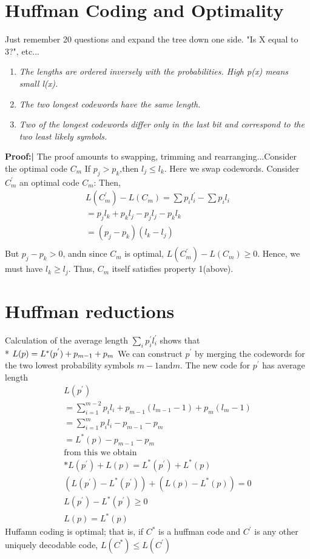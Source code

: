 \documentclass[10pt]{article}
\begin{document}
\begin{tiny}
\begin{multicols}{3}
\section*{Huffman Coding and Optimality}
Just remember 20 questions and expand the tree down one side. "Is X equal to 3?", etc...
\label{huffman}
\begin{enumerate}
	\item {\it The lengths are ordered inversely with the probabilities. High p(x) means small l(x).}
	\item {\it The two longest codewords have the same length.}
	\item {\it Two of the longest codewords differ only in the last bit and correspond to the two least likely symbols.}
\end{enumerate}
{\bf Proof:|} The proof amounts to swapping, trimming and rearranging...Consider the optimal code ${C_m}$
If ${p_j} > {p_k} \text{,then } {l_j} \leq {l_k}$. Here we swap codewords. Consider $C_m^{'}$ an optimal code ${C_m}$:
Then, \newline 
\begin{eqnarray}
L(C_m^{'}) - L(C_m) = \sum {p_i}{l_i^{'}} - \sum {p_i}{l_i} \\
={p_j}{l_k}+{p_k}{l_j} - {p_j}{l_j} - {p_k}{l_k}\\
=({p_j}-{p_k})({l_k}-{l_j})\\
\end{eqnarray}
But ${p_j} - {p_k} > 0$, andn since ${C_m}$ is optimal, $L(C_m^{'}) - L(C_m) \geq 0$.
Hence, we must have ${l_k} \geq {l_j}$. Thus, ${C_m}$ itself satisfies property 1(above).
\section*{Huffman reductions}
Calculation of the average length $\sum_i {p_i^{'}}{l_i^{'}}$ shows that \\*
$L(p) = L^{*}(p^{'})+p_{m-1} + p_m\\$
We can construct ${p^{'}}$ by merging the codewords for the two lowest probability symbols
${m-1} \text{and} {m}$.  The new code for ${p^{'}}$ has average length
\begin{eqnarray}
L(p^{'}) \\
= \sum_{i=1}^{m-2} p_i l_i + p_{m-1}(l_{m-1} -1 )+p_{m}(l_{m} -1)\\
=\sum_{i=1}^{m} {p_i}{l_i} - {p_{m-1}} - {p_{m}}\\
=L^{*}(p) - {p_{m-1}} - {p_{m}}\\
\text{from this we obtain} \\*
L(p^{'}) + L(p) = L^{*}(p^{'}) + L^{*}(p)\\
(L(p^{'}) -  L^{*}(p^{'})) + (L(p) - L^{*}(p)) = 0\\
L(p^{'}) - L^{*}(p^{'}) \geq 0 \\
L(p) = L^{*}(p)
\end{eqnarray}
 \label{thm: opthuff}
Huffamn coding is optimal; that is, if $C^{*}$ is a huffman code and $C^{'}$ is any other uniquely decodable code,
$L(C^{*}) \leq L(C^{'})$



\end{multicols}
\end{tiny}
\end{document}

